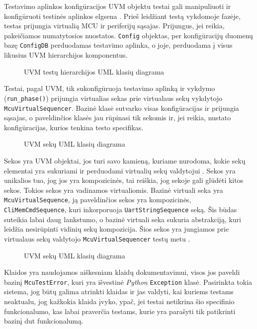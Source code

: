 Testavimo aplinkos konfigūracijos UVM objektu testai gali manipuliuoti ir konfigūruoti testinės aplinkos elgsena \pav{\ref{fig:uml_class_tb_cfg}}. Prieš leidžiant testą vykdomoje fazėje, testas prijungia virtualią MCU ir periferijų sąsajas. Prijungus, jei reikia, pakeičiamos numatytosios nuostatos. \texttt{Config} objektas, per konfigūracijų duomenų bazę \texttt{ConfigDB} perduodamas testavimo aplinka, o joje, perduodama į visus likusius UVM hierarchijos komponentus.

\begin{figure}[H]
	
	\caption{UVM testų hierarchijos UML klasių diagrama}
	\label{fig:uml_class_tb_test}
\end{figure}

Testai, pagal UVM, tik sukonfigūruoja testavimo aplinką ir vykdymo (\texttt{run\_phase()}) prijungia virtualias sekas prie virtualaus sekų vykdytojo \texttt{McuVirtualSequencer}. Bazinė klasė sutvarko visas konfigūracijas ir prijungia sąsajas, o paveldinčios klasės jau rūpinasi tik sekomis ir, jei reikia, nustato konfigūracijas, kurios tenkina testo specifikas.

\begin{figure}[H]
	
	\caption{UVM sekų UML klasių diagrama}
	\label{fig:uml_class_tb_seq}
\end{figure}

Sekos yra UVM objektai, jos turi savo kamieną, kuriame nurodoma, kokie sekų elementai yra sukuriami ir perduodami virtualių sekų valdytojui \pav{\ref{fig:uml_class_tb_seq}}. Sekos yra unikalios tuo, jog jos yra kompozicinės, tai reiškia, jog sekoje gali glūdėti kitos sekos. Tokios sekos yra vadinamos virtualiomis. Bazinė virtuali seka yra \texttt{McuVirtualSequence}, ją paveldinčios sekos yra kompozicinės, \texttt{CliMemCmdSequence}, kuri inkorporuoja \texttt{UartStringSequence} seką. Šis būdas suteikia labai daug lankstumo, o bazinė virtuali seka sukuria abstrakciją, kuri leidžia nesirūpinti vidinių sekų kompozicija. Šios sekos yra jungiamos prie virtualaus sekų valdytojo \texttt{McuVirtualSequencer} testų metu \pav{\ref{fig:uml_class_tb_test}}.

\begin{figure}[H]
	
	\caption{UVM sekų UML klasių diagrama}
	\label{fig:uml_class_tb_errors}
\end{figure}

Klaidos yra naudojamos aiškesniam klaidų dokumentavimui, visos jos paveldi bazinį \texttt{McuTestError}, kuri yra išvestinė \textit{Python} \texttt{Exception} klasė. Pasirinkta tokia sistema, jog būtų galima atrinkti klaidas ir jas valdyti, kai kuriems testams neaktualu, jog kažkokia klaida įvyko, ypač, jei testai netikrina šio specifinio funkcionalumo, kas labai praverčia testams, kurie yra parašyti tik patikrinti bazinį \gls{dut} funkcionalumą.

